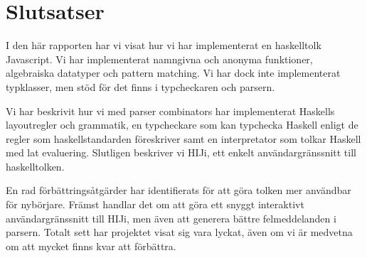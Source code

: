 \section{Slutsatser}
I den här rapporten har vi visat hur vi har implementerat en haskelltolk Javascript.
Vi har implementerat namngivna och anonyma funktioner, algebraiska datatyper och pattern matching. 
Vi har dock inte implementerat typklasser, men stöd för det finns i typcheckaren och parsern. 

Vi har beskrivit hur vi med parser combinators har implementerat Haskells layoutregler och grammatik, en typcheckare som  kan typchecka Haskell enligt de regler som haskellstandarden föreskriver samt en interpretator som tolkar Haskell med lat evaluering. Slutligen beskriver vi HIJi, ett enkelt användargränssnitt till haskelltolken. 

En rad förbättringsåtgärder har identifierats för att göra tolken mer användbar för nybörjare. Främst handlar det om att göra ett snyggt interaktivt användargränssnitt till HIJi, men även att generera bättre felmeddelanden i parsern. 
Totalt sett har projektet visat sig vara lyckat, även om vi är medvetna om att mycket finns kvar att förbättra.

